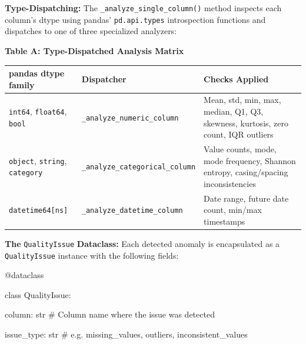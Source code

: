 \documentclass{article}
\newcounter{none} %
\begin{document}
\textbf{Type-Dispatching:} The \texttt{\_analyze\_single\_column()}
method inspects each column's dtype using pandas' \texttt{pd.api.types}
introspection functions and dispatches to one of three specialized
analyzers:

\textbf{Table A: Type-Dispatched Analysis Matrix}

{\def\LTcaptype{none} %
\begin{longtable}[]{@{}
  >{\raggedright\arraybackslash}p{}
  >{\raggedright\arraybackslash}p{}
  >{\raggedright\arraybackslash}p{}@{}}
\toprule\noalign{}
\begin{minipage}[b]{\linewidth}\raggedright
pandas dtype family
\end{minipage} & \begin{minipage}[b]{\linewidth}\raggedright
Dispatcher
\end{minipage} & \begin{minipage}[b]{\linewidth}\raggedright
Checks Applied
\end{minipage} \\
\midrule\noalign{}
\endhead
\bottomrule\noalign{}
\endlastfoot
\texttt{int64}, \texttt{float64}, \texttt{bool} &
\texttt{\_analyze\_numeric\_column} & Mean, std, min, max, median, Q1,
Q3, skewness, kurtosis, zero count, IQR outliers \\
\texttt{object}, \texttt{string}, \texttt{category} &
\texttt{\_analyze\_categorical\_column} & Value counts, mode, mode
frequency, Shannon entropy, casing/spacing inconsistencies \\
\texttt{datetime64{[}ns{]}} & \texttt{\_analyze\_datetime\_column} &
Date range, future date count, min/max timestamps \\
\end{longtable}
}

\textbf{The} \texttt{QualityIssue} \textbf{Dataclass:} Each detected
anomaly is encapsulated as a \texttt{QualityIssue} instance with the
following fields:

@dataclass

class QualityIssue:

column: str \# Column name where the issue was detected

issue\_type: str \# e.g.
\textquotesingle missing\_values\textquotesingle,
\textquotesingle outliers\textquotesingle,
\textquotesingle inconsistent\_values\textquotesingle{}
\end{document}
